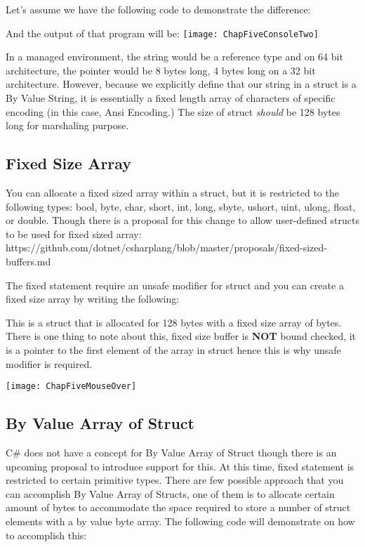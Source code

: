 Let's assume we have the following code to demonstrate the difference:



And the output of that program will be:
\newline
\newline
\texttt{[image: ChapFiveConsoleTwo]}
\newpage

In a managed environment, the string would be a reference type and on 64 bit architecture, the pointer would be 8 bytes long, 4 bytes long on a 32 bit architecture. However, because we explicitly define that our string in a struct is a By Value String, it is essentially a fixed length array of characters of specific encoding (in this case, Ansi Encoding.) The size of struct \textit{should} be 128 bytes long for marshaling purpose.

\subsection{Fixed Size Array}
You can allocate a fixed sized array within a struct, but it is restricted to the following types: bool, byte, char, short, int, long, sbyte, ushort, uint, ulong, float, or double. Though there is a proposal for this change to allow user-defined structs to be used for fixed sized array: \newline \newline
https://github.com/dotnet/csharplang/blob/master/proposals/fixed-sized-buffers.md
\newline \newline

The fixed statement require an unsafe modifier for struct and you can create a fixed size array by writing the following:



This is a struct that is allocated for 128 bytes with a fixed size array of bytes. There is one thing to note about this, fixed size buffer is \textbf{NOT} bound checked, it is a pointer to the first element of the array in struct hence this is why unsafe modifier is required.

\texttt{[image: ChapFiveMouseOver]}
\newpage

\subsection{By Value Array of Struct}
C\# does not have a concept for By Value Array of Struct though there is an upcoming proposal to introduce support for this. At this time, fixed statement is restricted to certain primitive types. There are few possible approach that you can accomplish By Value Array of Structs, one of them is to allocate certain amount of bytes to accommodate the space required to store a number of struct elements with a by value byte array. The following code will demonstrate on how to accomplish this:


